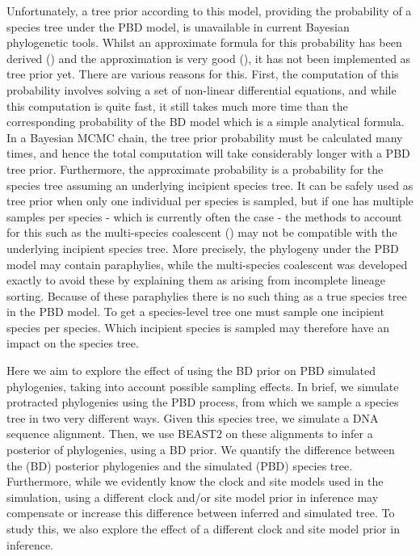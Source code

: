 Unfortunately, a tree prior according to this model, 
providing the probability of a species tree under the PBD model, 
is unavailable in current Bayesian phylogenetic tools. 
Whilst an approximate formula for this probability has been derived (\cite{lambert_et_al_2015}) 
and the approximation is very good (\cite{simonet_et_al_2018}), 
it has not been implemented as tree prior yet. 
There are various reasons for this. 
First, the computation of this probability involves solving a set of 
non-linear differential equations, and while this computation is quite fast, 
it still takes much more time than the corresponding probability 
of the BD model which is a simple analytical formula. 
In a Bayesian MCMC chain, the tree prior probability must be calculated many times, 
and hence the total computation will take considerably longer with a PBD tree prior. 
Furthermore, the approximate probability is a probability for the species tree 
assuming an underlying incipient species tree. 
It can be safely used as tree prior when only one individual per species is sampled, 
but if one has multiple samples per species - which is currently often the case - the methods 
to account for this such as the multi-species coalescent (\cite{heled_and_drummond_2009}) 
may not be compatible with the underlying incipient species tree. 
More precisely, the phylogeny under the PBD model may contain paraphylies, 
while the multi-species coalescent was developed exactly to avoid 
these by explaining them as arising from incomplete lineage sorting. 
Because of these paraphylies there is no such thing as a true species tree in the PBD model. 
To get a species-level tree one must sample one incipient species per species. 
Which incipient species is sampled may therefore have an impact on the species tree.

Here we aim to explore the effect of using the
BD prior on PBD simulated phylogenies, taking into account possible sampling effects.
In brief, we simulate protracted phylogenies using the PBD process,
from which we sample a species tree in two very different ways. Given this species tree, 
we simulate a DNA sequence alignment. Then, we use BEAST2 on these alignments
to infer a posterior of phylogenies, using a BD prior. We quantify the difference
between the (BD) posterior phylogenies and the simulated (PBD) species tree.
Furthermore, while we evidently know the clock and site models used in the simulation, 
using a different clock and/or site model prior in inference 
may compensate or increase this difference between inferred and simulated tree. 
To study this, we also explore the effect of 
a different clock and site model prior in inference.


